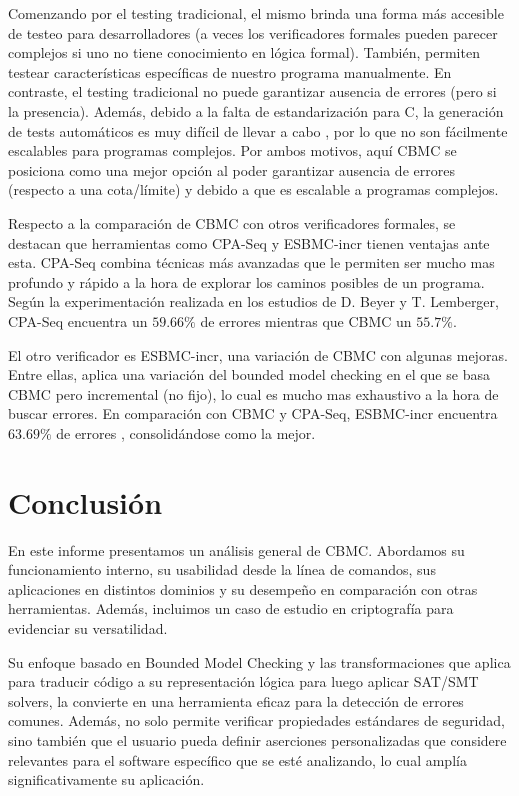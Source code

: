 \documentclass[runningheads]{llncs}
\begin{document}
Comenzando por el testing tradicional, el mismo brinda una forma más accesible de testeo para desarrolladores (a veces los verificadores 
formales pueden parecer complejos si uno no tiene conocimiento en lógica formal).
También, permiten testear características específicas de nuestro programa manualmente.
En contraste, el testing tradicional no puede garantizar ausencia de errores (pero si la presencia).
Además, debido a la falta de estandarización para C, la generación de tests automáticos es muy difícil de llevar a cabo \cite{cbmc-comparison}, 
por lo que no son fácilmente escalables para programas complejos.
Por ambos motivos, aquí CBMC se posiciona como una mejor opción al poder garantizar ausencia de errores (respecto a una cota/límite) y debido a que es escalable a programas complejos.

Respecto a la comparación de CBMC con otros verificadores formales, se destacan que herramientas como CPA-Seq y ESBMC-incr tienen ventajas ante esta.
CPA-Seq combina técnicas más avanzadas que le permiten ser mucho mas profundo y rápido a la hora de explorar los caminos posibles de un programa.
Según la experimentación realizada en los estudios de D. Beyer y T. Lemberger, CPA-Seq encuentra un $59.66\%$ de errores mientras que CBMC un $55.7\%$. \cite{cbmc-comparison}

El otro verificador es ESBMC-incr, una variación de CBMC con algunas mejoras.
Entre ellas, aplica una variación del bounded model checking en el que se basa CBMC pero incremental (no fijo), lo cual es mucho mas exhaustivo a la hora de buscar errores.
En comparación con CBMC y CPA-Seq, ESBMC-incr encuentra $63.69\%$ de errores \cite{cbmc-comparison}, consolidándose como la mejor.

%
\section{Conclusión}
En este informe presentamos un análisis general de CBMC.
Abordamos su funcionamiento interno, su usabilidad desde la línea de comandos, sus aplicaciones en distintos dominios y su desempeño en comparación con otras herramientas.
Además, incluimos un caso de estudio en criptografía para evidenciar su versatilidad.

Su enfoque basado en Bounded Model Checking y las transformaciones que aplica para traducir código a su representación lógica para luego aplicar SAT/SMT solvers, la convierte
en una herramienta eficaz para la detección de errores comunes.
Además, no solo permite verificar propiedades estándares de seguridad, sino también que el usuario pueda definir aserciones personalizadas que considere
relevantes para el software específico que se esté analizando, lo cual amplía significativamente su aplicación.
\end{document}
